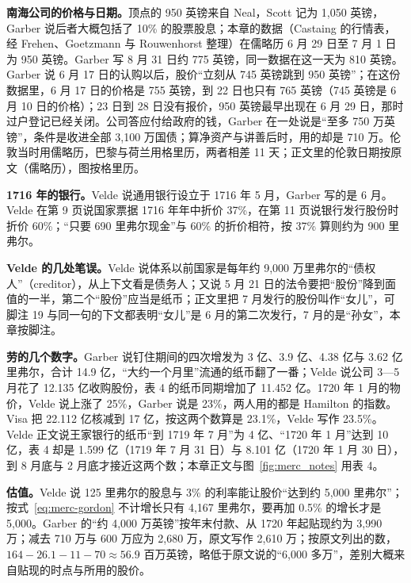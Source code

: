 \begin{deeper}[史料与几处不一致]
\textbf{南海公司的价格与日期。}顶点的 950 英镑来自 Neal，Scott 记为 1,050 英镑，Garber 说后者大概包括了 10\% 的股票股息；本章的数据（Castaing 的行情表，经 Frehen、Goetzmann 与 Rouwenhorst 整理）在儒略历 6 月 29 日至 7 月 1 日为 950 英镑。Garber 写 8 月 31 日约 775 英镑，同一数据在这一天为 810 英镑。Garber 说 6 月 17 日的认购以后，股价“立刻从 745 英镑跳到 950 英镑”；在这份数据里，6 月 17 日的价格是 755 英镑，到 22 日也只有 765 英镑（745 英镑是 6 月 10 日的价格）；23 日到 28 日没有报价，950 英镑最早出现在 6 月 29 日，那时过户登记已经关闭。公司答应付给政府的钱，Garber 在一处说是“至多 750 万英镑”，条件是收进全部 3,100 万国债；算净资产与讲善后时，用的却是 710 万。伦敦当时用儒略历，巴黎与荷兰用格里历，两者相差 11 天；正文里的伦敦日期按原文（儒略历），图按格里历。

\textbf{1716 年的银行。}Velde 说通用银行设立于 1716 年 5 月，Garber 写的是 6 月。Velde 在第 9 页说国家票据 1716 年年中折价 37\%，在第 11 页说银行发行股份时折价 60\%；“只要 690 里弗尔现金”与 60\% 的折价相符，按 37\% 算则约为 900 里弗尔。

\textbf{Velde 的几处笔误。}Velde 说体系以前国家是每年约 9,000 万里弗尔的“债权人”（creditor），从上下文看是债务人；又说 5 月 21 日的法令要把“股份”降到面值的一半，第二个“股份”应当是纸币；正文里把 7 月发行的股份叫作“女儿”，可脚注 19 与同一句的下文都表明“女儿”是 6 月的第二次发行，7 月的是“孙女”，本章按脚注。

\textbf{劳的几个数字。}Garber 说钉住期间的四次增发为 3 亿、3.9 亿、4.38 亿与 3.62 亿里弗尔，合计 14.9 亿，“大约一个月里”流通的纸币翻了一番；Velde 说公司 3—5 月花了 12.135 亿收购股份，表 4 的纸币同期增加了 11.452 亿。1720 年 1 月的物价，Velde 说上涨了 25\%，Garber 说是 23\%，两人用的都是 Hamilton 的指数。Visa 把 22.112 亿核减到 17 亿，按这两个数算是 23.1\%，Velde 写作 23.5\%。Velde 正文说王家银行的纸币“到 1719 年 7 月”为 4 亿、“1720 年 1 月”达到 10 亿，表 4 却是 1.599 亿（1719 年 7 月 31 日）与 8.101 亿（1720 年 1 月 30 日），到 8 月底与 2 月底才接近这两个数；本章正文与图~\ref{fig:merc_notes} 用表 4。

\textbf{估值。}Velde 说 125 里弗尔的股息与 3\% 的利率能让股价“达到约 5,000 里弗尔”；按式~\eqref{eq:merc-gordon} 不计增长只有 4,167 里弗尔，要再加 0.5\% 的增长才是 5,000。Garber 的“约 4,000 万英镑”按年末付款、从 1720 年起贴现约为 3,990 万；减去 710 万与 600 万应为 2,680 万，原文写作 2,610 万；按原文列出的数，$164-26.1-11-70\approx56.9$ 百万英镑，略低于原文说的“6,000 多万”，差别大概来自贴现的时点与所用的股价。


\end{deeper}
